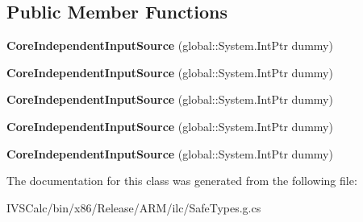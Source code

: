 \subsection*{Public Member Functions}
\begin{DoxyCompactItemize}
\item 
\mbox{\label{class_windows_1_1_u_i_1_1_core_1_1_core_independent_input_source_aa33f7fe67de9ec1b7cc619ce7ef9b71d}} 
{\bfseries Core\+Independent\+Input\+Source} (global\+::\+System.\+Int\+Ptr dummy)
\item 
\mbox{\label{class_windows_1_1_u_i_1_1_core_1_1_core_independent_input_source_aa33f7fe67de9ec1b7cc619ce7ef9b71d}} 
{\bfseries Core\+Independent\+Input\+Source} (global\+::\+System.\+Int\+Ptr dummy)
\item 
\mbox{\label{class_windows_1_1_u_i_1_1_core_1_1_core_independent_input_source_aa33f7fe67de9ec1b7cc619ce7ef9b71d}} 
{\bfseries Core\+Independent\+Input\+Source} (global\+::\+System.\+Int\+Ptr dummy)
\item 
\mbox{\label{class_windows_1_1_u_i_1_1_core_1_1_core_independent_input_source_aa33f7fe67de9ec1b7cc619ce7ef9b71d}} 
{\bfseries Core\+Independent\+Input\+Source} (global\+::\+System.\+Int\+Ptr dummy)
\item 
\mbox{\label{class_windows_1_1_u_i_1_1_core_1_1_core_independent_input_source_aa33f7fe67de9ec1b7cc619ce7ef9b71d}} 
{\bfseries Core\+Independent\+Input\+Source} (global\+::\+System.\+Int\+Ptr dummy)
\end{DoxyCompactItemize}


The documentation for this class was generated from the following file\+:\begin{DoxyCompactItemize}
\item 
I\+V\+S\+Calc/bin/x86/\+Release/\+A\+R\+M/ilc/Safe\+Types.\+g.\+cs\end{DoxyCompactItemize}
